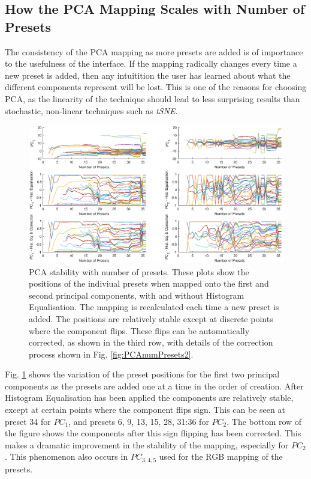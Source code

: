 \documentclass[11pt, oneside]{report}   	%
\begin{document}
\subsection{How the PCA Mapping Scales with Number of Presets}\label{sec:PCAmappingScale}
The consistency of the PCA mapping as more presets are added is of importance to the usefulness of the interface. If the mapping radically changes every time a new preset is added, then any intuitition the user has learned about what the different components represent will be lost. This is one of the reasons for choosing PCA, as the linearity of the technique should lead to less surprising results than stochastic, non-linear techniques such as \emph{tSNE}.\\
\begin{figure}[h]
	\hspace{-80pt}
	\includegraphics[trim={0, 1cm, 0, 1cm}, clip, width = 8.5in]{PCAnumPresets1.eps}
	\caption{PCA stability with number of presets. These plots show the positions of the indiviual presets when mapped onto the first and second principal components, with and without Histogram Equalisation. The mapping is recalculated each time a new preset is added. The positions are relatively stable except at discrete points where the component flips. These flips can be automatically corrected, as shown in the third row, with details of the correction process shown in Fig. \ref{fig:PCAnumPresets2}.}
	\label{fig:PCAnumPresets}
		\vspace{-10pt}
\end{figure}
Fig. \ref{fig:PCAnumPresets} shows the variation of the preset positions for the first two principal components as the presets are added one at a time in the order of creation. After Histogram Equalisation has been applied the components are relatively stable, except at certain points where the component flips sign. This can be seen at preset 34 for $PC_1$, and presets 6, 9, 13, 15, 28, 31:36 for $PC_2$. The bottom row of the figure shows the components after this sign flipping has been corrected. This makes a dramatic improvement in the stability of the mapping, especially for $PC_2$. This phenomenon also occurs in $PC_{3,4,5}$ used for the RGB mapping of the presets.
\end{document}
